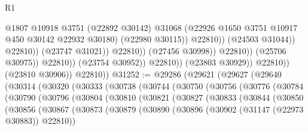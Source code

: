 \begin{lexlean}{R1}
\begin{coremodule}
                                                    @1807
                                                    @10918
                                                    @3751
                                                    (@22892 @30142)
                                                    @31068
                                                    (@22926
                                                      @1650
                                                      @3751
                                                      @10917
                                                      @450
                                                      @30142
                                                      @22932
                                                      @30180)
                                                    (@22980 @30115))
                                                  @22810))
                                              (@24503 @31044))
                                            @22810))
                                        (@23747 @31021))
                                      @22810))
                                  (@27456 @30998))
                                @22810))
                            (@25706 @30975))
                          @22810))
                      (@23754 @30952))
                    @22810))
                (@23803 @30929))
              @22810))
          (@23810 @30906))
        @22810))
@31252 := @29286
    (@29621
      (@29627
        (@29640
          (@30314
            (@30320
              (@30333
                (@30738
                  (@30744
                    (@30750
                      (@30756
                        (@30776
                          (@30784
                            (@30790
                              (@30796
                                (@30804
                                  (@30810
                                    (@30821
                                      (@30827
                                        (@30833
                                          (@30844
                                            (@30850
                                              (@30856
                                                (@30867
                                                  (@30873
                                                    (@30879
                                                      (@30890
                                                        (@30896
                                                          (@30902 (@31147 (@22973 @30883)) @22810))

\end{coremodule}
\end{lexlean}
